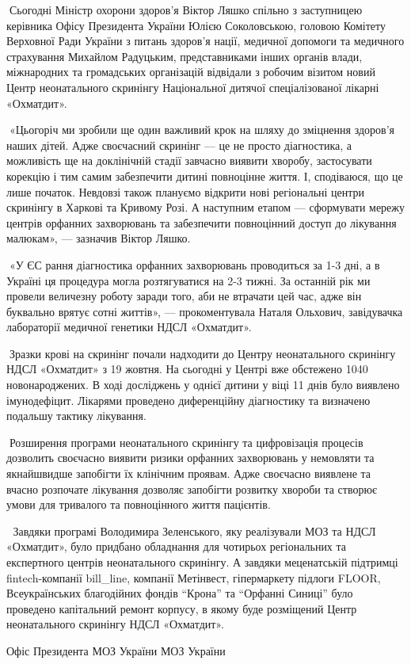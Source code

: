 🔻Сьогодні Міністр охорони здоров'я Віктор Ляшко спільно з заступницею
керівника Офісу Президента України Юлією Соколовською, головою Комітету
Верховної Ради України з питань здоров’я нації, медичної допомоги та медичного
страхування Михайлом Радуцьким, представниками інших органів влади, міжнародних
та громадських організацій відвідали з робочим візитом новий Центр
неонатального скринінгу Національної дитячої спеціалізованої лікарні
«Охматдит».

🔻«Цьогоріч ми зробили ще один важливий крок на шляху до зміцнення здоров'я
наших дітей. Адже своєчасний скринінг — це не просто діагностика, а можливість
ще на доклінічній стадії завчасно виявити хворобу, застосувати корекцію і тим
самим забезпечити дитині повноцінне життя. І, сподіваюся, що це лише початок.
Невдовзі також плануємо відкрити нові регіональні центри скринінгу в Харкові та
Кривому Розі. А наступним етапом — сформувати мережу центрів орфанних
захворювань та забезпечити повноцінний доступ до лікування малюкам», — зазначив
Віктор Ляшко.

🔻«У ЄС рання діагностика орфанних захворювань проводиться за 1-3 дні, а в
Україні ця процедура могла розтягуватися на 2-3 тижні. За останній рік ми
провели величезну роботу заради того, аби не втрачати цей час, адже він
буквально врятує сотні життів», — прокоментувала Наталя Ольхович, завідувачка
лабораторії медичної генетики НДСЛ «Охматдит».

🔻Зразки крові на скринінг почали надходити до Центру неонатального скринінгу
НДСЛ «Охматдит» з 19 жовтня. На сьогодні у Центрі вже обстежено 1040
новонароджених. В ході досліджень у однієї дитини у віці 11 днів було виявлено
імунодефіцит. Лікарями проведено диференційну діагностику та визначено подальшу
тактику лікування. 

🔻Розширення програми неонатального скринінгу та цифровізація процесів
дозволить своєчасно виявити ризики орфанних захворювань у немовляти та
якнайшвидше запобігти їх клінічним проявам. Адже своєчасно виявлене та вчасно
розпочате лікування дозволяє запобігти розвитку хвороби та створює умови для
тривалого та повноцінного життя пацієнтів. 

🔻 Завдяки програмі Володимира Зеленського, яку реалізували МОЗ та НДСЛ
«Охматдит», було придбано обладнання для чотирьох регіональних та експертного
центрів неонатального скринінгу. А завдяки меценатській підтримці
fintech-компанії bill\_line, компанії Метінвест, гіпермаркету підлоги FLOOR,
Всеукраїнських благодійних фондів \enquote{Крона} та \enquote{Орфанні Синиці}  було проведено
капітальний ремонт корпусу, в якому буде розміщений Центр неонатального
скринінгу НДСЛ «Охматдит».

Офіс Президента МОЗ України МОЗ України


